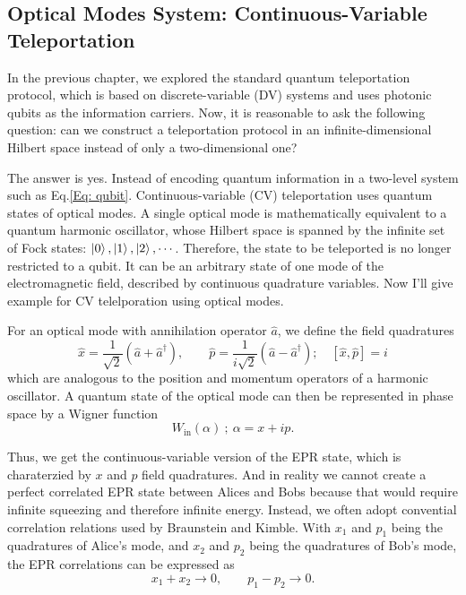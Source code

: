 \documentclass[aps,prd,preprint,floats,epsf,superscriptaddress,nofootinbib]{revtex4}
\begin{document}
\subsection{Optical Modes System: Continuous-Variable Teleportation}

In the previous chapter, we explored the standard quantum teleportation protocol, which is based on discrete-variable (DV) systems and uses photonic qubits as the information carriers. Now, it is reasonable to ask the following question: can we construct a teleportation protocol in an infinite-dimensional Hilbert space instead of only a two-dimensional one?

The answer is yes. Instead of encoding quantum information in a two-level system such as
Eq.\ref{Eq: qubit}. Continuous-variable (CV) teleportation uses quantum states of optical modes. A single optical mode is mathematically equivalent to a quantum harmonic oscillator, whose Hilbert space is spanned by the infinite set of Fock states: $\ket{0}, \ket{1}, \ket{2}, \cdots $. Therefore, the state to be teleported is no longer restricted to a qubit. It can be an arbitrary state of one mode of the electromagnetic field, described by continuous quadrature variables. 
Now I'll give example for CV telelporation using optical modes.

For an optical mode with annihilation  operator $\hat{a}$, we define the field quadratures
\begin{equation}
    \hat{x} = \frac{1}{\sqrt{2}}(\hat{a}+\hat{a}^{\dagger}),
    \qquad
    \hat{p} = \frac{1}{i\sqrt{2}}(\hat{a}-\hat{a}^{\dagger});
    \quad 
    [\hat{x},\hat{p}] = i
\end{equation}
which are analogous to the position and momentum operators of a harmonic oscillator. 
A quantum state of the optical mode can then be represented in phase space by a Wigner function
\begin{equation}
    W_{\text{in}}(\alpha
    ) ~;~ \alpha = x+ip.
    \label{Eq:Wigner_function_input}
\end{equation}


Thus, we get the continuous-variable version of the EPR state, which is charaterzied by $x$ and $p$ field quadratures. 
And in reality we cannot create a perfect correlated EPR state between Alices and Bobs because that would require infinite squeezing and therefore infinite energy.
Instead, we often adopt convential correlation relations
used by Braunstein and Kimble\cite{PhysRevLett.80.869}. With $x_1$ and $p_1$ being the quadratures of Alice's mode, and $x_2$ and $p_2$ being the quadratures of Bob's mode, the EPR correlations can be expressed as
\begin{equation}
    x_1 + x_2 \rightarrow 0,
    \qquad
    p_1 - p_2 \rightarrow 0.
    \label{Eq:Correlation}
\end{equation}
\end{document}
